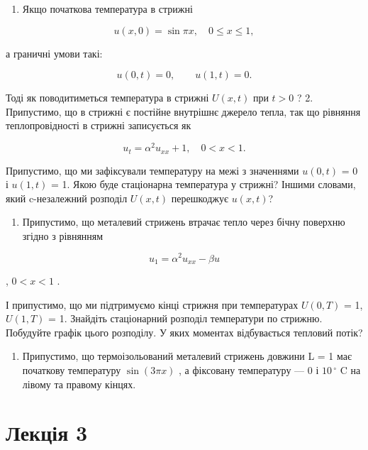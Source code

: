 \documentclass[
  ukrainian,
]{article}
\providecommand{\tightlist}{%
  \setlength{\itemsep}{0pt}\setlength{\parskip}{0pt}}
\begin{document}
\begin{enumerate}
\def\labelenumi{\arabic{enumi}.}
\tightlist
\item
  Якщо початкова температура в стрижні
\end{enumerate}

\[
u(x, 0) = \sin \pi x, \quad 0 \leqslant x \leqslant 1,
\]

а граничні умови такі:

\[
u(0, t) = 0, \qquad u(1, t) = 0.
\]

Тоді як поводитиметься температура в стрижні \(U(x, t)\) при \(t > 0\) ?
2. Припустимо, що в стрижні є постійне внутрішнє джерело тепла, так що
рівняння теплопровідності в стрижні записується як

\[
u_t = \alpha^2 u_{xx} + 1, \quad 0 < x < 1.
\]

Припустимо, що ми зафіксували температуру на межі з значеннями
\(u(0, t)\) = 0 і \(u(1, t)\) = 1. Якою буде стаціонарна температура у
стрижні? Іншими словами, який c-незалежний розподіл \(U(x, t)\)
перешкоджує \(u(x, t)\)?

\begin{enumerate}
\def\labelenumi{\arabic{enumi}.}
\setcounter{enumi}{2}
\tightlist
\item
  Припустимо, що металевий стрижень втрачає тепло через бічну поверхню
  згідно з рівнянням
\end{enumerate}

\[
u_1 = \alpha^2 u_{xx} - \beta u
\]

, \(0 < x < 1\) .

І припустимо, що ми підтримуємо кінці стрижня при температурах
\(U(0, T)\) = 1, \(U(1, T)\) = 1. Знайдіть стаціонарний розподіл
температури по стрижню. Побудуйте графік цього розподілу. У яких
моментах відбувається тепловий потік?

\begin{enumerate}
\def\labelenumi{\arabic{enumi}.}
\setcounter{enumi}{3}
\tightlist
\item
  Припустимо, що термоізольований металевий стрижень довжини L = 1 має
  початкову температуру \(\sin(3\pi x)\) , а фіксовану температуру --- 0
  і \(10\,^{\circ}\) C на лівому та правому кінцях.
\end{enumerate}

\section{Лекція 3}\label{ux43bux435ux43aux446ux456ux44f-3}
\end{document}
